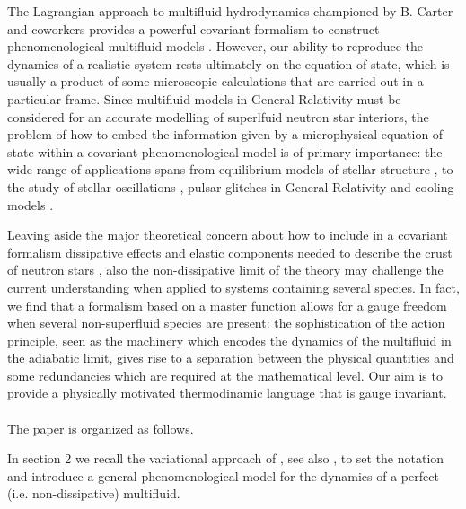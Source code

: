 \documentclass[usenatbib]{mnras}
\begin{document}
The Lagrangian approach to multifluid hydrodynamics championed by B. Carter and coworkers  provides a powerful covariant formalism to construct phenomenological multifluid models \citep{noto_rel}. 
However, our ability to reproduce the dynamics of a realistic system rests ultimately on the equation of state, which is usually a product of some microscopic calculations that are carried out in a particular frame. 
Since multifluid models in General Relativity must be considered for an accurate modelling of superlfuid neutron star interiors, the problem of how to embed the information given by a microphysical equation of state within a covariant phenomenological model is of primary importance: the wide range of applications spans from equilibrium models of stellar structure \citep[e.g. ][]{andersson_comer2000,sourie2016PhRvD}, to the study of stellar oscillations \citep[e.g. ][]{and_com_lang_2002,GusakovAndersson2006}, pulsar glitches in General Relativity \citep[e.g. ][]{sourie_glitch2017,antonelli+2018} and cooling models \citep{yako_cooling_rev}.
%

Leaving aside the major theoretical concern about how to include in a covariant formalism dissipative effects \citep[see e.g. ][ for an approach to the issue within the multi-fluid paradigm]{lopez2011} and elastic components  \citep{carter1972foundations,ander_elasticity_2019} needed to describe the crust of neutron stars \citep{chamel_review_crust}, also the  non-dissipative limit of the theory may challenge the current understanding when applied to systems containing several species. In fact, we find that a  formalism based on a master function allows for a gauge freedom when several non-superfluid species are present: the sophistication of the action principle, seen as the machinery which encodes the dynamics of the multifluid in the adiabatic limit, gives rise to a separation between the physical quantities and some redundancies which are required at the mathematical level. Our aim is to provide a physically motivated thermodinamic language that is gauge invariant.
\\
\\
%
The paper is organized as follows.


In section 2 we recall the variational approach of \cite{Comer_1993}, see also \cite{andersson2007review}, to set the notation and introduce a general phenomenological model for the dynamics of a perfect (i.e. non-dissipative) multifluid.
\end{document}
